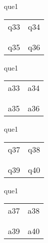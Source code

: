 \documentclass[13.5pt, varwidth=true]{beamer}
\begin{document}
\begin{frame}[shrink=19,fragile]
	\begin{beamercolorbox}[rounded=true, left, shadow=true,wd=14.8cm]{que1}
		\begin{tabular}{p{7cm} | p{7cm}}
			\parbox{7cm}{q33 } & \parbox{7cm}{q34 } \\\\ 
			\hline
			\\ \parbox{7cm}{q35 } & \parbox{7cm}{q36 } \\
		\end{tabular}
	\end{beamercolorbox}
\end{frame}
\begin{frame}[shrink=19,fragile]
	\begin{beamercolorbox}[rounded=true, left, shadow=true,wd=14.8cm]{que1}
		\begin{tabular}{p{7cm} | p{7cm}}
			\textcolor{ared}{a33 }  & \textcolor{ared}{a34 } \\\\ 
			\hline
			\\ \textcolor{ared}{a35 }  & \textcolor{ared}{a36 } \\
		\end{tabular}
	\end{beamercolorbox}
\end{frame}

\begin{frame}[shrink=19,fragile]
	\begin{beamercolorbox}[rounded=true, left, shadow=true,wd=14.8cm]{que1}
		\begin{tabular}{p{7cm} | p{7cm}}
			\parbox{7cm}{q37 } & \parbox{7cm}{q38 } \\\\ 
			\hline
			\\ \parbox{7cm}{q39 } & \parbox{7cm}{q40 } \\
		\end{tabular}
	\end{beamercolorbox}
\end{frame}
\begin{frame}[shrink=19,fragile]
	\begin{beamercolorbox}[rounded=true, left, shadow=true,wd=14.8cm]{que1}
		\begin{tabular}{p{7cm} | p{7cm}}
			\textcolor{ared}{a37 }  & \textcolor{ared}{a38 } \\\\ 
			\hline
			\\ \textcolor{ared}{a39 }  & \textcolor{ared}{a40 } \\
		\end{tabular}
	\end{beamercolorbox}
\end{frame}
\end{document}
